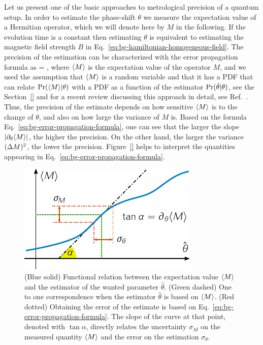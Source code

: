 Let us present one of the basic approaches to metrological precision of a quantum setup.
In order to estimate the phase-shift $\theta$ we measure the expectation value of a Hermitian operator, which we will denote here by $M$ in the following.
If the evolution time is a constant then estimating $\theta$ is equivalent to estimating the magnetic field strength $B$ in Eq.~\eqref{eq:bg-hamiltonian-homogeneous-field}.
The precision of the estimation can be characterized with the error propagation formula as
\be
  \label{eq:bg-error-propagation-formula}
  \varian{\theta} = ,
\ee
where $\langle M \rangle$ is the expectation value of the operator $M$, and we used the assumption that $\langle M \rangle$ is a random variable and that it has a PDF that can relate $\text{Pr}(\langle M \rangle|\theta)$ with a PDF as a function of the estimator $\text{Pr}(\hat{\theta}|\theta)$, see the Section~\ref{} and for a recent review discussing this approach in detail, see Ref.~\citep{MR38}.
Thus, the precision of the estimate depends on how sensitive $\langle M \rangle$ is to the change of $\theta$, and also on how large the variance of $M$ is.
Based on the formula Eq.~\eqref{eq:bg-error-propagation-formula}, one can see that the larger the slope $|\partial_\theta \langle M \rangle|$, the higher the precision.
On the other hand, the larger the variance $(\Delta M )^2$, the lower the precision.
Figure~\ref{} helps to interpret the quantities appearing in Eq.~\eqref{eq:bg-error-propagation-formula}.
\begin{figure}
  \centering
  \includegraphics[scale=1.4]{img/BG_expect_m_evo.pdf}
  \caption[Graphical explanation of the error-propagation formula]{(Blue solid) Functional relation between the expectation value $\langle M \rangle$ and the estimator of the wanted parameter $\hat\theta$.
  (Green dashed) One to one correspondence when the estimator $\hat{\theta}$ is based on $\langle M \rangle$. (Red dotted) Obtaining the error of the estimate is based on Eq.~\eqref{eq:bg-error-propagation-formula}.
  The slope of the curve at that point, denoted with $\tan\alpha$, directly relates the uncertainty $\sigma_M$ on the measured quantity $\langle M \rangle$ and the error on the estimation $\sigma_\theta$.}
  \label{fig:bg-expect-m-evo}
\end{figure}

